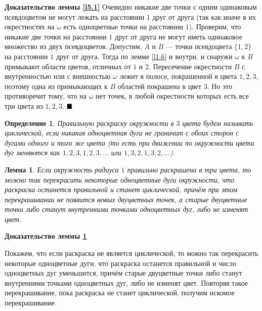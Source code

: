 \documentclass[12pt,a4paper]{article}
\newtheorem{mydef}{Определение}
\newtheorem{lemma}{Лемма}
\renewcommand{\qed}{$\blacksquare \vspace{5mm}$}
\begin{document}
\textbf{Доказательство леммы \ref{l5.1}}
Очевидно никакие две точки с одним одинаковым псевдоцветом не могут лежать на расстоянии $1$ друг от друга (так как иначе в их окрестностях на $\omega$ есть одноцветные точки на расстоянии $1$). Проверим, что никакие две точки на расстоянии $1$ друг от друга не могут иметь одинаковое множество из двух псевдоцветов. Допустим, $A$ и $B$ --- точки псевдоцвета $\{1, 2\}$ на расстоянии $1$ друг от друга. Тогда по лемме \ref{l1.6} и внутри, и снаружи $\omega$ к $B$ примыкают области цветов, отличных от $1$ и $2$. Пересечение окрестности $B$ с внутренностью или с внешностью $\omega$ лежит в полосе, покрашенной в цвета $1, 2, 3$, поэтому одна из примыкающих к $B$ областей покрашена в цвет $3$. Но это противоречит тому, что на $\omega$ нет точек, в любой окрестности которых есть все три цвета из $1, 2, 3$. \qed

\begin{mydef}
	Правильную раскраску окружности в $3$ цвета будем называть циклической, если никакая одноцветная дуга не граничит с обоих сторон с дугами одного и того же цвета (то есть при движении по окружности цвета дуг меняются как $1, 2, 3, 1, 2, 3, \ldots$ или $1, 3, 2, 1, 3, 2, \ldots$).
\end{mydef}

\begin{lemma} \label{l5.2}
	Если окружность радиуса $1$ правильно раскрашена в три цвета, то можно так перекрасить некоторые одноцветные дуги окружности, что раскраска останется правильной и станет циклической, причём при этом перекрашивании не появится новых двуцветных точек, а старые двуцветные точки либо станут внутренними точками одноцветных дуг, либо не изменят цвет.
\end{lemma}

\textbf{Доказательство леммы \ref{l5.2}}

	Покажем, что если раскраска не является циклической, то можно так перекрасить некоторые одноцветные дуги, что раскраска останется правильной и число одноцветных дуг уменьшится, причём старые двуцветные точки либо станут внутренними точками одноцветных дуг, либо не изменят цвет. Повторяя такое перекрашивание, пока раскраска не станет циклической, получим искомое перекрашивание.
	
\end{document}
